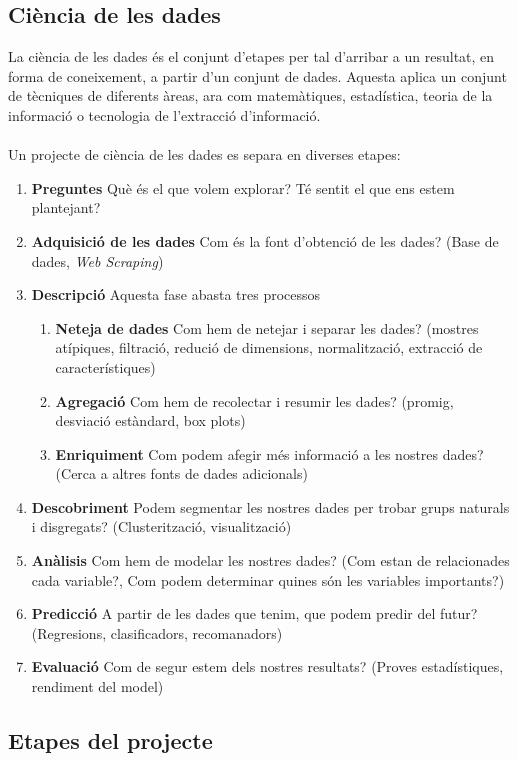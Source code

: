 \documentclass[11pt,a4paper,catalan]{article}
\begin{document}
\subsection{Ciència de les dades}
La ciència de les dades és el conjunt d'etapes per tal d'arribar a un resultat, en forma de coneixement, a partir d'un conjunt de dades. Aquesta aplica un conjunt de tècniques de diferents àreas, ara com matemàtiques, estadística, teoria de la informació o tecnologia de l'extracció d'informació.
\\
\\
Un projecte de ciència de les dades es separa en diverses etapes:
\begin{enumerate}
	\item \textbf{Preguntes} Què és el que volem explorar? Té sentit el que ens estem plantejant?
	\item \textbf{Adquisició de les dades} Com és la font d'obtenció de les dades? (Base de dades, \textit{Web Scraping})
	\item \textbf{Descripció} Aquesta fase abasta tres processos
	\begin{enumerate}
		\item \textbf{Neteja de dades} Com hem de netejar i separar les dades? (mostres atípiques, filtració, redució de dimensions, normalització, extracció de característiques)
		\item \textbf{Agregació} Com hem de recolectar i resumir les dades? (promig, desviació estàndard, box plots)
		\item \textbf{Enriquiment} Com podem afegir més informació a les nostres dades? (Cerca a altres fonts de dades adicionals)
	\end{enumerate}
	\item \textbf{Descobriment} Podem segmentar les nostres dades per trobar grups naturals i disgregats? (Clusterització, visualització)
	\item \textbf{Anàlisis} Com hem de modelar les nostres dades? (Com estan de relacionades cada variable?, Com podem determinar quines són les variables importants?)
	\item \textbf{Predicció} A partir de les dades que tenim, que podem predir del futur? (Regresions, clasificadors, recomanadors)
	\item \textbf{Evaluació} Com de segur estem dels nostres resultats? (Proves estadístiques, rendiment del model)
	
\end{enumerate}
\subsection{Etapes del projecte}
\end{document}
